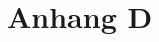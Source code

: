 %
%
\glsresetall

\let\raggedsection\centering 
\chapter{Anhang D}\label{chap.appendix_aushang}
\let\raggedsection\raggedright 
